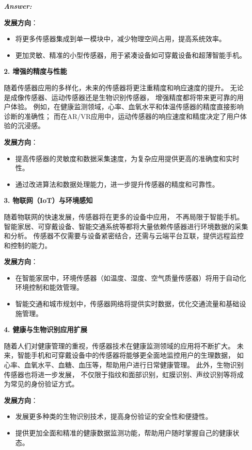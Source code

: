\documentclass[12pt]{article}
\newenvironment{Answer}{
  \vspace{12pt}
  {\large\textbf{\textit{\hspace{-12pt}Answer:}}}\par
  \vspace{8pt}
} {\vspace{24pt}}
\begin{document}
\begin{Answer}
\textbf{发展方向}：
\begin{itemize}
    \item 将更多传感器集成到单一模块中，减少物理空间占用，提高系统效率。
    \item 更加灵敏、精准的小型传感器，用于紧凑设备如可穿戴设备和超薄智能手机。
\end{itemize}

\noindent\textbf{2. 增强的精度与性能}\noindent

随着传感器应用的多样化，未来的传感器将更注重精度和响应速度的提升。
无论是成像传感器、运动传感器还是生物识别传感器，
增强精度都将带来更可靠的用户体验。
例如，在健康监测领域，心率、血氧水平和体温传感器的精度直接影响诊断的准确性；
而在AR/VR应用中，运动传感器的响应速度和精度决定了用户体验的沉浸感。

\textbf{发展方向}：
\begin{itemize}
    \item 提高传感器的灵敏度和数据采集速度，为复杂应用提供更高的准确度和实时性。
    \item 通过改进算法和数据处理能力，进一步提升传感器的精度和可靠性。
\end{itemize}

\noindent\textbf{3. 物联网（IoT）与环境感知}\noindent

随着物联网的快速发展，传感器将在更多的设备中应用，
不再局限于智能手机。
智能家居、可穿戴设备、智能交通系统等都将大量依赖传感器进行环境数据的采集和分析。
传感器不仅需要与设备紧密结合，还需与云端平台互联，提供远程监控和控制的能力。

\textbf{发展方向}：
\begin{itemize}
    \item 在智能家居中，环境传感器（如温度、湿度、空气质量传感器）将用于自动化环境控制和能效管理。
    \item 智能交通和城市规划中，传感器网络将提供实时数据，优化交通流量和基础设施管理。
\end{itemize}

\noindent\textbf{4. 健康与生物识别应用扩展}\noindent

随着人们对健康管理的重视，传感器技术在健康监测领域的应用将不断扩大。
未来，智能手机和可穿戴设备中的传感器将能够更全面地监控用户的生理数据，
如心率、血氧水平、血糖、血压等，帮助用户进行日常健康管理。
此外，生物识别传感器也将进一步发展，
不仅限于指纹和面部识别，虹膜识别、声纹识别等将成为常见的身份验证方式。

\textbf{发展方向}：
\begin{itemize}
    \item 发展更多种类的生物识别技术，提高身份验证的安全性和便捷性。
    \item 提供更加全面和精准的健康数据监测功能，帮助用户随时掌握自己的健康状态。
\end{itemize}


\end{Answer}
\end{document}
